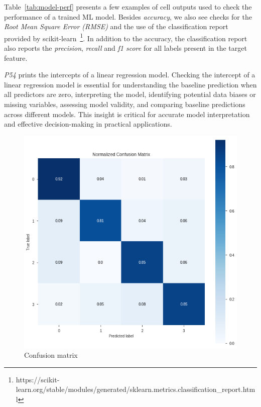 Table~\ref{tab:model-perf} presents a few examples of cell outputs used to check the performance of a trained ML model. Besides \emph{accuracy}, we also see checks for the \emph{Root Mean Square Error (RMSE)} and the use of the classification report provided by scikit-learn~\footnote{https://scikit-learn.org/stable/modules/generated/sklearn.metrics.classification\_report.html}. In addition to the accuracy, the classification report also reports the \emph{precision}, \emph{recall} and \emph{f1 score} for all labels present in the target feature.

\emph{P54} prints the intercepts of a linear regression model. Checking the intercept of a linear regression model is essential for understanding the baseline prediction when all predictors are zero, interpreting the model, identifying potential data biases or missing variables, assessing model validity, and comparing baseline predictions across different models. This insight is critical for accurate model interpretation and effective decision-making in practical applications.

\begin{figure}
\includegraphics[width=\linewidth]{model-perf-confusion-matrix.png}
\caption{Confusion matrix}
\label{fig:model-perf-confusion-matrix}
\end{figure}

